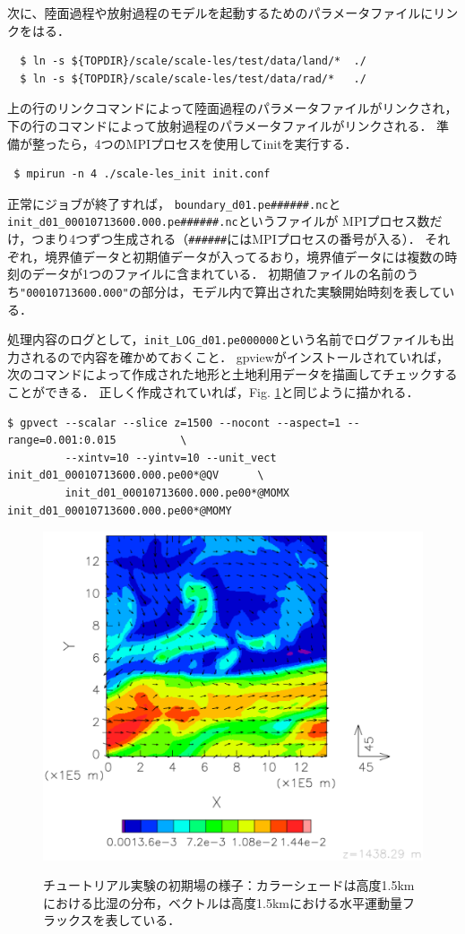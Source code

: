 次に、陸面過程や放射過程のモデルを起動するためのパラメータファイルにリンクをはる．
\begin{verbatim}
  $ ln -s ${TOPDIR}/scale/scale-les/test/data/land/*  ./
  $ ln -s ${TOPDIR}/scale/scale-les/test/data/rad/*   ./
\end{verbatim}
上の行のリンクコマンドによって陸面過程のパラメータファイルがリンクされ，
下の行のコマンドによって放射過程のパラメータファイルがリンクされる．
準備が整ったら，4つのMPIプロセスを使用してinitを実行する．
\begin{verbatim}
 $ mpirun -n 4 ./scale-les_init init.conf
\end{verbatim}

正常にジョブが終了すれば，
\verb|boundary_d01.pe######.nc|と\verb|init_d01_00010713600.000.pe######.nc|というファイルが
MPIプロセス数だけ，つまり4つずつ生成される（\verb|######|にはMPIプロセスの番号が入る）．
それぞれ，境界値データと初期値データが入ってるおり，境界値データには複数の時刻のデータが1つのファイルに含まれている．
初期値ファイルの名前のうち\verb|"00010713600.000"|の部分は，モデル内で算出された実験開始時刻を表している．

処理内容のログとして，\verb|init_LOG_d01.pe000000|という名前でログファイルも出力されるので内容を確かめておくこと．
gpviewがインストールされていれば，次のコマンドによって作成された地形と土地利用データを描画してチェックすることができる．
正しく作成されていれば，Fig. \ref{fig:init}と同じように描かれる．

\begin{verbatim}
$ gpvect --scalar --slice z=1500 --nocont --aspect=1 --range=0.001:0.015          \
         --xintv=10 --yintv=10 --unit_vect init_d01_00010713600.000.pe00*@QV      \
         init_d01_00010713600.000.pe00*@MOMX init_d01_00010713600.000.pe00*@MOMY
\end{verbatim}


\begin{figure}[h]
\begin{center}
  \includegraphics[width=0.7\hsize]{./figure/init_qv-momxy.eps}\\
  \caption{チュートリアル実験の初期場の様子：カラーシェードは高度1.5kmにおける比湿の分布，ベクトルは高度1.5kmにおける水平運動量フラックスを表している．}
  \label{fig:init}
\end{center}
\end{figure}


